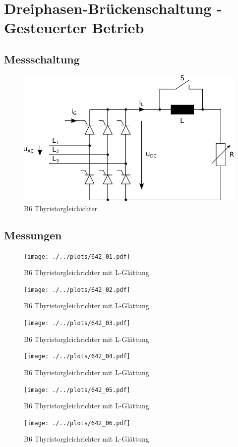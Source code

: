 \section{Dreiphasen-Brückenschaltung - Gesteuerter Betrieb}

\subsection{Messschaltung}

\begin{figure}[h!]
    \centering
    \includegraphics[scale=\sscale]{./../fig/b6_thyristor.pdf}
    \caption{B6 Thyristorgleichichter}
    \label{fig:b6_thyristor}
\end{figure}

\subsection{Messungen}

\begin{figure}[h!]
    \centering
    \texttt{[image: ./../plots/642\_01.pdf]}
    \caption{B6 Thyristorgleichrichter mit L-Glättung}
\end{figure}

\begin{figure}[h!]
    \centering
    \texttt{[image: ./../plots/642\_02.pdf]}
    \caption{B6 Thyristorgleichrichter mit L-Glättung}
\end{figure}

\begin{figure}[h!]
    \centering
    \texttt{[image: ./../plots/642\_03.pdf]}
    \caption{B6 Thyristorgleichrichter mit L-Glättung}
\end{figure}

\begin{figure}[h!]
    \centering
    \texttt{[image: ./../plots/642\_04.pdf]}
    \caption{B6 Thyristorgleichrichter mit L-Glättung}
\end{figure}

\begin{figure}[h!]
    \centering
    \texttt{[image: ./../plots/642\_05.pdf]}
    \caption{B6 Thyristorgleichrichter mit L-Glättung}
\end{figure}

\begin{figure}[h!]
    \centering
    \texttt{[image: ./../plots/642\_06.pdf]}
    \caption{B6 Thyristorgleichrichter mit L-Glättung}
\end{figure}

\clearpage
